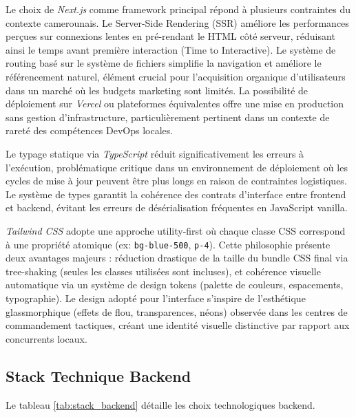 Le choix de \textit{Next.js} comme framework principal répond à plusieurs contraintes du contexte camerounais. Le Server-Side Rendering (SSR) améliore les performances perçues sur connexions lentes en pré-rendant le HTML côté serveur, réduisant ainsi le temps avant première interaction (Time to Interactive). Le système de routing basé sur le système de fichiers simplifie la navigation et améliore le référencement naturel, élément crucial pour l'acquisition organique d'utilisateurs dans un marché où les budgets marketing sont limités. La possibilité de déploiement sur \textit{Vercel} ou plateformes équivalentes offre une mise en production sans gestion d'infrastructure, particulièrement pertinent dans un contexte de rareté des compétences DevOps locales.

Le typage statique via \textit{TypeScript} réduit significativement les erreurs à l'exécution, problématique critique dans un environnement de déploiement où les cycles de mise à jour peuvent être plus longs en raison de contraintes logistiques. Le système de types garantit la cohérence des contrats d'interface entre frontend et backend, évitant les erreurs de désérialisation fréquentes en JavaScript vanilla.

\textit{Tailwind CSS} adopte une approche utility-first où chaque classe CSS correspond à une propriété atomique (ex: \texttt{bg-blue-500}, \texttt{p-4}). Cette philosophie présente deux avantages majeurs : réduction drastique de la taille du bundle CSS final via tree-shaking (seules les classes utilisées sont incluses), et cohérence visuelle automatique via un système de design tokens (palette de couleurs, espacements, typographie). Le design adopté pour l'interface s'inspire de l'esthétique glassmorphique (effets de flou, transparences, néons) observée dans les centres de commandement tactiques, créant une identité visuelle distinctive par rapport aux concurrents locaux.

\subsection{Stack Technique Backend}

Le tableau \ref{tab:stack_backend} détaille les choix technologiques backend.


